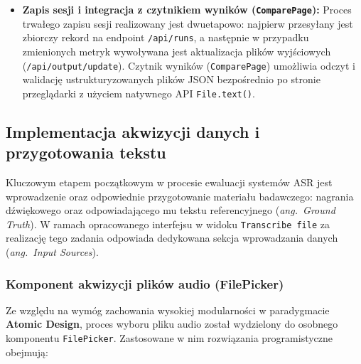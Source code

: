 \begin{itemize}
    \item \textbf{Zapis sesji i integracja z czytnikiem wyników (\texttt{ComparePage}):}
    Proces trwałego zapisu sesji realizowany jest dwuetapowo: najpierw przesyłany jest zbiorczy rekord na endpoint \texttt{/api/runs}, a następnie w przypadku zmienionych metryk wywoływana jest aktualizacja plików wyjściowych (\texttt{/api/output/update}). Czytnik wyników (\texttt{ComparePage}) umożliwia odczyt i walidację ustrukturyzowanych plików JSON bezpośrednio po stronie przeglądarki z użyciem natywnego API \texttt{File.text()}.
\end{itemize}
\subsection{Implementacja akwizycji danych i przygotowania tekstu}
\label{subsec:audio_text_acquisition}

Kluczowym etapem początkowym w procesie ewaluacji systemów ASR jest wprowadzenie oraz odpowiednie przygotowanie materiału badawczego: nagrania dźwiękowego oraz odpowiadającego mu tekstu referencyjnego (\textit{ang.~Ground Truth}). W ramach opracowanego interfejsu w widoku \texttt{Transcribe file} za realizację tego zadania odpowiada dedykowana sekcja wprowadzania danych (\textit{ang.~Input Sources}).

\subsubsection{Komponent akwizycji plików audio (FilePicker)}

Ze względu na wymóg zachowania wysokiej modularności w paradygmacie \textbf{Atomic Design}, proces wyboru pliku audio został wydzielony do osobnego komponentu \texttt{FilePicker}. Zastosowane w nim rozwiązania programistyczne obejmują:

